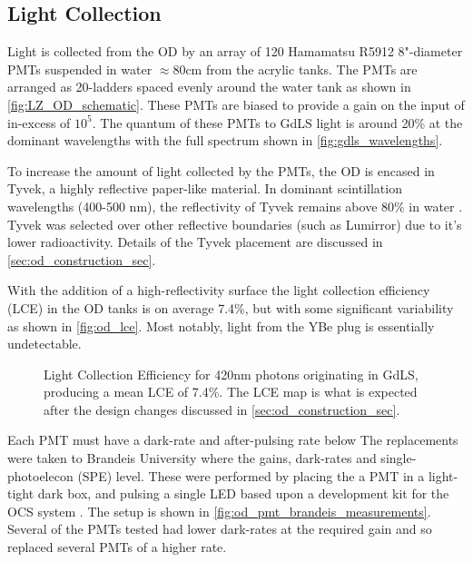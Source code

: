 \subsection{Light Collection}
\par
Light is collected from the OD by an array of 120 Hamamatsu R5912 8"-diameter PMTs suspended in water $\approx$80cm from the acrylic tanks.
The PMTs are arranged as 20-ladders spaced evenly around the water tank as shown in \autoref{fig:LZ_OD_schematic}.
These PMTs are biased to provide a gain on the input of in-excess of $10^{5}$.
The quantum of these PMTs to GdLS light is around 20\% at the dominant wavelengths with the full spectrum shown in \autoref{fig:gdls_wavelengths}.

\par
To increase the amount of light collected by the PMTs, the OD is encased in Tyvek, a highly reflective paper-like material.
In dominant scintillation wavelengths (400-500 nm), the reflectivity of Tyvek remains above 80\% in water \cite{tyvek_thesis_ref,tyvek_reflectivity_ref}. 
Tyvek was selected over other reflective boundaries (such as Lumirror{\texttrademark}) due to it's lower radioactivity.
Details of the Tyvek placement are discussed in \autoref{sec:od_construction_sec}.
\par
With the addition of a high-reflectivity surface the light collection efficiency (LCE) in the OD tanks is on average 7.4\%, but with some significant variability as shown in \autoref{fig:od_lce}.
Most notably, light from the YBe plug is essentially undetectable.

\begin{figure}[!htbp]
\centering
\resizebox{\textwidth}{!}{

}
\caption[Light Collection Efficiency for 420nm photons originating in GdLS]{Light Collection Efficiency for 420nm photons originating in GdLS, producing a mean LCE of 7.4\%.
The LCE map is what is expected after the design changes discussed in \autoref{sec:od_construction_sec}.}
\label{fig:od_lce}
\end{figure}

%

\iffalse

\par
Each PMT must have a dark-rate and after-pulsing rate below 
The replacements were taken to Brandeis University where the gains, dark-rates and single-photoelecon (SPE) level.
These were performed by placing the a PMT in a light-tight dark box, and pulsing a single LED based upon a development kit for the OCS system \cite{lz_ocs_system_ref}.
The setup is shown in \autoref{fig:od_pmt_brandeis_measurements}.
Several of the PMTs tested had lower dark-rates at the required gain and so replaced several PMTs of a higher rate.

